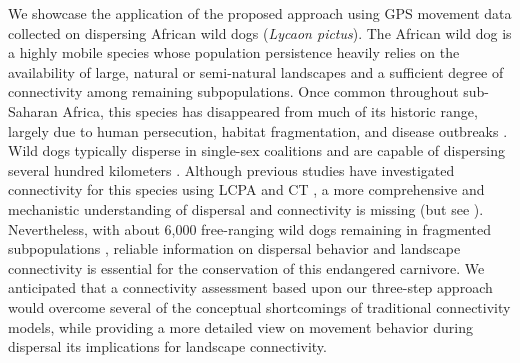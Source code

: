 \documentclass[../FinalThesis.tex]{subfiles}
\begin{document}

We showcase the application of the proposed approach using GPS movement data
collected on dispersing African wild dogs (\textit{Lycaon pictus}). The African
wild dog is a highly mobile species whose population persistence heavily relies
on the availability of large, natural or semi-natural landscapes and a
sufficient degree of connectivity among remaining subpopulations. Once common
throughout sub-Saharan Africa, this species has disappeared from much of its
historic range, largely due to human persecution, habitat fragmentation, and
disease outbreaks \citep{Woodroffe.2012}. Wild dogs typically disperse in
single-sex coalitions \citep{McNutt.1996, Behr.2020} and are capable of
dispersing several hundred kilometers \citep{Davies-Mostert.2012, Masenga.2016,
Cozzi.2020}. Although previous studies have investigated connectivity for this
species using LCPA \citep{Hofmann.2021} and CT \citep{Brennan.2020}, a more
comprehensive and mechanistic understanding of dispersal and connectivity is
missing (but see \citealp{Creel.2020}). Nevertheless, with about 6,000
free-ranging wild dogs remaining in fragmented subpopulations
\citep{Woodroffe.2012}, reliable information on dispersal behavior and landscape
connectivity is essential for the conservation of this endangered carnivore. We
anticipated that a connectivity assessment based upon our three-step approach
would overcome several of the conceptual shortcomings of traditional
connectivity models, while providing a more detailed view on movement behavior
during dispersal its implications for landscape connectivity.
\end{document}
